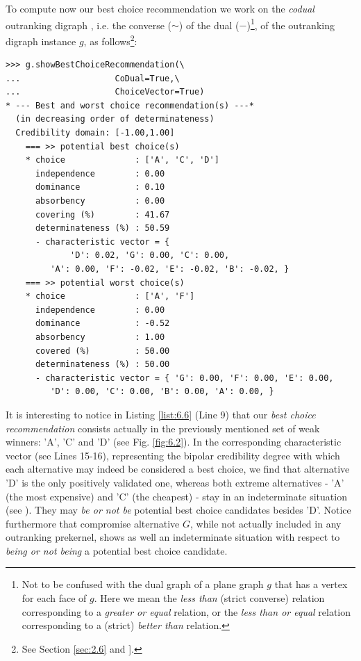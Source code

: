 To compute now our \Rubis best choice recommendation we work on the \emph{codual} outranking digraph , i.e. the converse ($\sim$) of the dual ($-$)\footnote{Not to be confused with the dual graph of a plane graph $g$ that has a vertex for each face of $g$. Here we mean the \emph{less than} (strict converse) relation corresponding to a \emph{greater or equal} relation, or the \emph{less than or equal} relation corresponding to a (strict) \emph{better than} relation.}, of the outranking digraph instance $g$, as follows\footnote{See Section \ref{sec:2.6} and \citet{BIS-2013}].}:
\begin{lstlisting}[caption={Computing the best choice recommendation},label=list:6.6]
>>> g.showBestChoiceRecommendation(\
...                   CoDual=True,\
...                   ChoiceVector=True)   
* --- Best and worst choice recommendation(s) ---*
  (in decreasing order of determinateness)   
  Credibility domain: [-1.00,1.00]
    === >> potential best choice(s)
    * choice              : ['A', 'C', 'D']
      independence        : 0.00
      dominance           : 0.10
      absorbency          : 0.00
      covering (%)        : 41.67
      determinateness (%) : 50.59
      - characteristic vector = {
             'D': 0.02, 'G': 0.00, 'C': 0.00,
	     'A': 0.00, 'F': -0.02, 'E': -0.02, 'B': -0.02, }
    === >> potential worst choice(s) 
    * choice              : ['A', 'F']
      independence        : 0.00
      dominance           : -0.52
      absorbency          : 1.00
      covered (%)         : 50.00
      determinateness (%) : 50.00
      - characteristic vector = { 'G': 0.00, 'F': 0.00, 'E': 0.00,
	     'D': 0.00, 'C': 0.00, 'B': 0.00, 'A': 0.00, }
\end{lstlisting}				  
It is interesting to notice in Listing \ref{list:6.6} (Line 9) that our \emph{best choice recommendation} consists actually in the previously mentioned set of weak \Condorcet winners: 'A', 'C' and 'D' (see Fig. \ref{fig:6.2}). In the corresponding characteristic vector (see Lines 15-16), representing the bipolar credibility degree with which each alternative may indeed be considered a best choice, we find that alternative 'D' is the only positively validated one, whereas both extreme alternatives - 'A' (the most expensive) and 'C' (the cheapest) - stay in an indeterminate situation (see \citet{BIS-2006a,BIS-2006b}). They may \emph{be or not be} potential best choice candidates besides 'D'. Notice furthermore that compromise alternative $G$, while not actually included in any outranking prekernel, shows as well an indeterminate situation with respect to \emph{being or not being} a potential best choice candidate.

